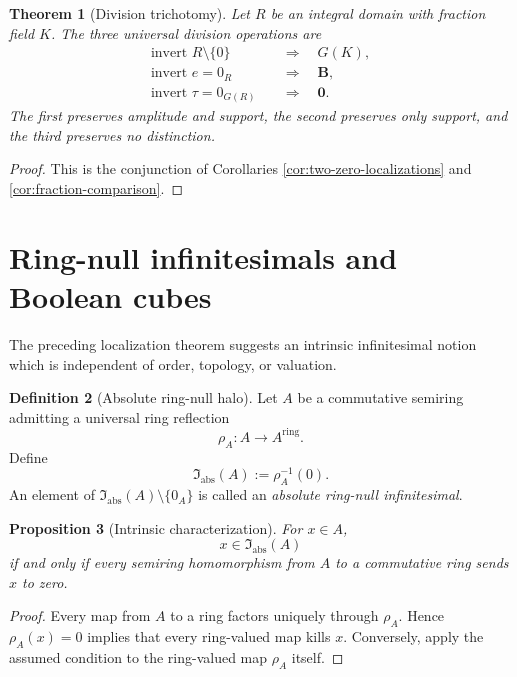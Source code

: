 \documentclass[11pt]{amsart}
\numberwithin{equation}{section}
\newtheorem{theorem}{Theorem}[section]
\newtheorem{proposition}[theorem]{Proposition}
\theoremstyle{definition}
\newtheorem{definition}[theorem]{Definition}
\newcommand{\B}{\mathbf B}
\newcommand{\zero}{\mathbf 0}
\begin{document}
\begin{theorem}[Division trichotomy]\label{thm:division-trichotomy}
Let $R$ be an integral domain with fraction field $K$.  The three universal division operations are
\[
\boxed{
\begin{aligned}
\text{invert }R\setminus\{0\}
&\quad\Longrightarrow\quad G(K),\\
\text{invert }e=0_R
&\quad\Longrightarrow\quad \B,\\
\text{invert }\tau=0_{G(R)}
&\quad\Longrightarrow\quad \zero.
\end{aligned}}
\]
The first preserves amplitude and support, the second preserves only support, and the third preserves no distinction.
\end{theorem}

\begin{proof}
This is the conjunction of Corollaries \ref{cor:two-zero-localizations} and \ref{cor:fraction-comparison}.
\end{proof}

\section{Ring-null infinitesimals and Boolean cubes}

The preceding localization theorem suggests an intrinsic infinitesimal notion which is independent of order, topology, or valuation.

\begin{definition}[Absolute ring-null halo]\label{def:absolute-halo}
Let $A$ be a commutative semiring admitting a universal ring reflection
\[
\rho_A:A\longrightarrow A^{\mathrm{ring}}.
\]
Define
\[
\mathfrak I_{\mathrm{abs}}(A):=\rho_A^{-1}(0).
\]
An element of $\mathfrak I_{\mathrm{abs}}(A)\setminus\{0_A\}$ is called an \emph{absolute ring-null infinitesimal}.
\end{definition}

\begin{proposition}[Intrinsic characterization]\label{prop:absolute-characterization}
For $x\in A$,
\[
x\in\mathfrak I_{\mathrm{abs}}(A)
\]
if and only if every semiring homomorphism from $A$ to a commutative ring sends $x$ to zero.
\end{proposition}

\begin{proof}
Every map from $A$ to a ring factors uniquely through $\rho_A$.  Hence $\rho_A(x)=0$ implies that every ring-valued map kills $x$.  Conversely, apply the assumed condition to the ring-valued map $\rho_A$ itself.
\end{proof}
\end{document}
